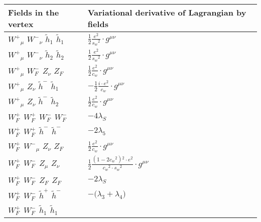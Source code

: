 \begin{center}
\begin{tabular}{|l|l|} \hline
Fields in the vertex & Variational derivative of Lagrangian by fields \\ \hline
$W^+{}_{\mu }$ \phantom{-} $W^-{}_{\nu }$ \phantom{-} $\widetilde{h}_1{}_{}$ \phantom{-} $\widetilde{h}_1{}_{}$ \phantom{-}  &
	$\frac{1}{2}\frac{ e{}^2 }{ s_w{}^2 }\cdot g^{\mu \nu} $\\[2mm]
$W^+{}_{\mu }$ \phantom{-} $W^-{}_{\nu }$ \phantom{-} $\widetilde{h}_2{}_{}$ \phantom{-} $\widetilde{h}_2{}_{}$ \phantom{-}  &
	$\frac{1}{2}\frac{ e{}^2 }{ s_w{}^2 }\cdot g^{\mu \nu} $\\[2mm]
$W^+{}_{\mu }$ \phantom{-} $W^-_F{}_{}$ \phantom{-} ${Z}_{\nu }$ \phantom{-} $Z_F{}_{}$ \phantom{-}  &
	$\frac{1}{2}\frac{ e{}^2 }{ c_w}\cdot g^{\mu \nu} $\\[2mm]
$W^+{}_{\mu }$ \phantom{-} ${Z}_{\nu }$ \phantom{-} $\widetilde{h}^-{}_{}$ \phantom{-} $\widetilde{h}_1{}_{}$ \phantom{-}  &
	$-\frac{1}{2}\frac{ i \cdot e{}^2 }{ c_w}\cdot g^{\mu \nu} $\\[2mm]
$W^+{}_{\mu }$ \phantom{-} ${Z}_{\nu }$ \phantom{-} $\widetilde{h}^-{}_{}$ \phantom{-} $\widetilde{h}_2{}_{}$ \phantom{-}  &
	$\frac{1}{2}\frac{ e{}^2 }{ c_w}\cdot g^{\mu \nu} $\\[2mm]
$W^+_F{}_{}$ \phantom{-} $W^+_F{}_{}$ \phantom{-} $W^-_F{}_{}$ \phantom{-} $W^-_F{}_{}$ \phantom{-}  &
	$-4 \lambda_S$\\[2mm]
$W^+_F{}_{}$ \phantom{-} $W^+_F{}_{}$ \phantom{-} $\widetilde{h}^-{}_{}$ \phantom{-} $\widetilde{h}^-{}_{}$ \phantom{-}  &
	$-2 \lambda_5$\\[2mm]
$W^+_F{}_{}$ \phantom{-} $W^-{}_{\mu }$ \phantom{-} ${Z}_{\nu }$ \phantom{-} $Z_F{}_{}$ \phantom{-}  &
	$\frac{1}{2}\frac{ e{}^2 }{ c_w}\cdot g^{\mu \nu} $\\[2mm]
$W^+_F{}_{}$ \phantom{-} $W^-_F{}_{}$ \phantom{-} ${Z}_{\mu }$ \phantom{-} ${Z}_{\nu }$ \phantom{-}  &
	$\frac{1}{2}\frac{ (1-2 c_w {}^2){}^2  \cdot e{}^2 }{ c_w{}^2  \cdot s_w{}^2 }\cdot g^{\mu \nu} $\\[2mm]
$W^+_F{}_{}$ \phantom{-} $W^-_F{}_{}$ \phantom{-} $Z_F{}_{}$ \phantom{-} $Z_F{}_{}$ \phantom{-}  &
	$-2 \lambda_S$\\[2mm]
$W^+_F{}_{}$ \phantom{-} $W^-_F{}_{}$ \phantom{-} $\widetilde{h}^+{}_{}$ \phantom{-} $\widetilde{h}^-{}_{}$ \phantom{-}  &
	$-\big( \lambda_3+ \lambda_4\big)$\\[2mm]
$W^+_F{}_{}$ \phantom{-} $W^-_F{}_{}$ \phantom{-} $\widetilde{h}_1{}_{}$ \phantom{-} $\widetilde{h}_1{}_{}$ \phantom{-}  &

\end{tabular}
\end{center}
